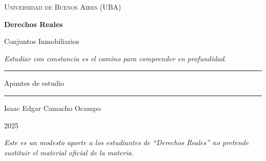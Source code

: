 \documentclass[12pt,oneside]{book}
\newcommand{\universidad}{Universidad de Buenos Aires (UBA)}
\newcommand{\materia}{Derechos Reales}
\newcommand{\titulo}{Conjuntos Inmobiliarios}
\newcommand{\autor}{Isaac Edgar Camacho Ocampo}
\newcommand{\anio}{2025}
\begin{document}
\begin{titlepage}

\thispagestyle{empty}

\begin{center}

\vspace*{1cm}

{\large \textsc{\universidad}}

\vspace{3.5cm}

{\Huge \textbf{\materia}}

\vspace{1cm}

{\LARGE \titulo}

\vspace{0.8cm}

\textit{Estudiar con constancia es el camino para comprender en profundidad.}

\vspace{1.2cm}

\rule{0.70\textwidth}{0.5pt}

\vspace{0.5cm}

{\large Apuntes de estudio}

\vspace{0.5cm}

\rule{0.70\textwidth}{0.5pt}

\vfill

{\large \autor}

\vspace{0.3cm}

{\large \anio}

\end{center}

\vfill

\begin{flushleft}
\textit{Este es un modesto aporte a los estudiantes de ``Derechos Reales'' no pretende sustituir el material oficial de la materia.}
\end{flushleft}

\end{titlepage}

\tableofcontents

\end{document}

